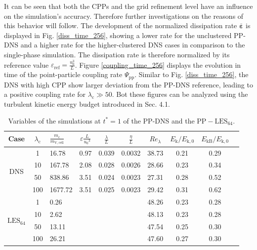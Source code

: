\documentclass[11pt,a4paper,openany,oneside,parskip=half*]{article}
\renewcommand*\vec[1]{\boldsymbol{#1}}
\begin{document}
It can be seen that both the CPPs and the grid refinement level have an influence on the simulation's accuracy. Therefore further investigations on the reasons of this behavior will follow.
\newline %
The development of the normalized dissipation rate $\bar{\vec{\varepsilon}}$ is displayed in Fig. \ref{diss_time_256}, showing a lower rate for the unclustered PP-DNS and a higher rate for the higher-clustered DNS cases in comparison to the single-phase simulation. The dissipation rate is therefore normalized by its reference value $\varepsilon_\mathrm{ref}=\frac{u_0^3}{L}$.
\newline %
Figure \ref{coupling_time_256} displays the evolution in time of the point-particle coupling rate $\Psi_\mathrm{pp}$. Similar to Fig. \ref{diss_time_256}, the DNS with high CPP show larger deviation from the PP-DNS reference, leading to a positive coupling rate for $\lambda_\mathrm{c} \gg 50$.
\newline
Bot these figures can be analyzed using the turbulent kinetic energy budget introduced in Sec. 4.1.
\begin{table}[]
	\begin{center}
	\begin{tabular}{| c | c l | c c c c c c c |}
	\hline
	Case & $\lambda_\mathrm{c}$& $\frac{m_\mathrm{c}}{m_\mathrm{V,cell}}$ &$\varepsilon \frac{L}{{u_0}^3}$ & $\frac{\lambda}{L}$ & $\frac{\eta}{L} $ & $Re_\lambda$ & $E_\mathrm{k}/E_\mathrm{k,0}$ & $E_\mathrm{kB}/E_\mathrm{k,0}$ & \\
	\hline
	\hline
	\multirow{4}{*}{DNS}
	&1 &16.78 & 0.97& 0.039 & 0.0032 & 38.73 & 0.21 & 0.29 &\\
	&10 &167.78 & 2.08 & 0.028 & 0.0026 & 28.66 & 0.23 & 0.34 &\\
	&50 &838.86 & 3.51 & 0.024 & 0.0023 & 27.31 & 0.28 & 0.52 &\\
	&100 &1677.72 & 3.51 & 0.025 & 0.0023 & 29.42 & 0.31 & 0.62 &\\
	\hline
	\hline
	\multirow{4}{*}{$\mathrm{LES_{64}}$}
	&1 & 0.26 & &  &  & 48.26 & 0.23 & 0.28 &\\
	&10 & 2.62 & &  &  & 48.13 & 0.23 & 0.28 &\\
	&50 & 13.11 & &  &  & 47.54 & 0.25 & 0.30 &\\
	&100 & 26.21 & &  &  & 47.60 & 0.27 & 0.30 &\\
	\hline
	\end{tabular}
	\captionsetup{width=0.9\linewidth}
	\caption{Variables of the simulations at $t^*=1$ of the PP-DNS and the $\mathrm{PP-LES_{64}}$.}
	\label{table_values_DNS_LES}
	\end{center}
	\end{table}
\end{document}
